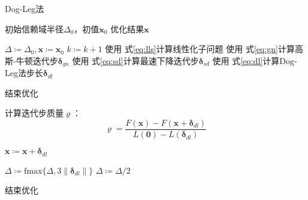 \begin{algorithm}[htb!]
\caption{Dog-Leg法}
\begin{algorithmic}
    \Require 初始信赖域半径$\Delta_0$，初值$\bm{x}_0$
    \Ensure 优化结果$\bm{x}$

    \State $\Delta \coloneqq \Delta_0, \bm{x} \coloneqq \bm{x}_0$
        \State $k \coloneqq k+1$
        \State 使用 式\eqref{eq:lls}计算线性化子问题
        \State 使用 式\eqref{eq:gn}计算高斯-牛顿迭代步$\bm{\delta}_{gn}$
        \State 使用 式\eqref{eq:sd}计算最速下降迭代步$\bm{\delta}_{sd}$
        \State 使用 式\eqref{eq:dl}计算Dog-Leg法步长$\bm{\delta}_{dl}$

            \State 结束优化
        \EndIf

        \State 计算迭代步质量$\varrho$：
        \[
            \varrho = \frac {F(\bm{x})-F(\bm{x}+\bm{\delta}_{dl})}
                            {L(\bm{0})-L(\bm{\delta}_{dl})}
        \]

            \State $\bm{x} \coloneqq \bm{x} + \bm{\delta}_{dl}$
        \EndIf

            \State $\Delta \coloneqq \text{fmax}\{\Delta,3\left\|\bm{\delta}_{dl}\right\|\}$
            \State $\Delta \coloneqq \Delta/2$
        \EndIf

            \State 结束优化
        \EndIf
    \EndFor
\end{algorithmic}
\label{alg:dogleg}
\end{algorithm}
